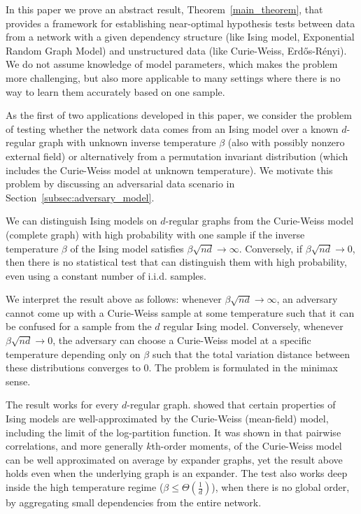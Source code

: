 \documentclass[final,12pt]{colt2018}
\begin{document}
In this paper we prove an abstract result, Theorem~\ref{main_theorem}, that provides a framework for establishing near-optimal hypothesis tests between data from a network with a given dependency structure (like Ising model, Exponential Random Graph Model) and unstructured data (like Curie-Weiss, Erd\H{o}s-R\'enyi). We do not assume knowledge of model parameters, which makes the problem more challenging, but also more applicable to many settings where there is no way to learn them accurately based on one sample. 

As the first of two applications developed in this paper, we consider the problem of testing whether the network data comes from an Ising model over a known $d$-regular graph with unknown inverse temperature $\beta$ (also with possibly nonzero external field) or alternatively from a permutation invariant distribution (which includes the Curie-Weiss model at unknown temperature). We motivate this problem by discussing an adversarial data scenario in Section~\ref{subsec:adversary_model}. 

\begin{theorem}
We can distinguish Ising models on $d$-regular graphs from the Curie-Weiss model (complete graph) with high probability with one sample if the inverse temperature $\beta$ of the Ising model satisfies $\beta\sqrt{nd} \to \infty $. Conversely, if $\beta\sqrt{nd} \to 0$, then there is no statistical test that can distinguish them with high probability, even using a constant number of i.i.d. samples.
\end{theorem} 

\begin{remark}
We interpret the result above as follows: whenever $\beta\sqrt{nd} \to \infty$, an adversary cannot come up with a Curie-Weiss sample at some temperature such that it can be confused for a sample from the $d$ regular Ising model. Conversely, whenever $\beta\sqrt{nd} \to 0$, the adversary can choose a Curie-Weiss model at a specific temperature depending only on $\beta$ such that the total variation distance between these distributions converges to $0$. The problem is formulated in the minimax sense. 
\label{rem:explain_ising_result}
\end{remark}

The result works for every $d$-regular graph. \citet{basak2017universality} showed that certain properties of Ising models are well-approximated by the Curie-Weiss (mean-field) model, including the limit of the log-partition function. 
It was shown in \citet{bresler2017stein} that pairwise correlations, and more generally $k$th-order moments, of the Curie-Weiss model can be well approximated on average by expander graphs, yet the result above holds even when the underlying graph is an expander. The test also works deep inside the high temperature regime ($\beta \leq \Theta(\frac{1}{d})$), when there is no global order, by aggregating small dependencies from the entire network.
\end{document}
